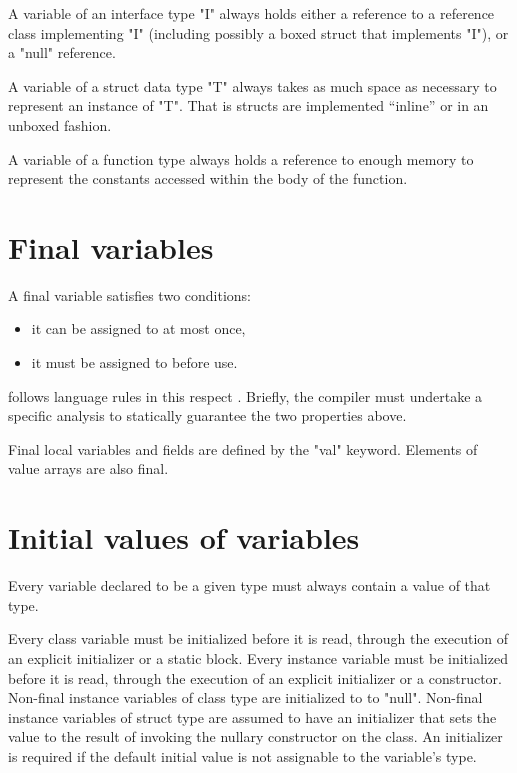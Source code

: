 
A variable of an interface type \xcd"I" always holds either a
reference to a reference class implementing \xcd"I" (including possibly
a boxed struct that implements \xcd"I"), or a \xcd"null"
reference.

A variable of a struct data type \xcd"T"  always takes as much
space as necessary to represent an instance of \xcd"T". That is
structs are implemented ``inline'' or in an unboxed fashion.

A variable of a function type always holds a reference to enough
memory to represent the constants accessed within the body of the
function.

\section{Final variables}
\label{FinalVariables}
A final variable satisfies two conditions: 
\begin{itemize}
\item it can be assigned to at most once, 
\item it must be assigned to before use. 
\end{itemize}

\Xten{} follows \java{} language rules in this respect \cite[\S
4.5.4,8.3.1.2,16]{jls2}. Briefly, the compiler must undertake a
specific analysis to statically guarantee the two properties above.

Final local variables and fields are defined by the \xcd"val"
keyword.  Elements of value arrays are also final.


\section{Initial values of variables}
\label{NullaryConstructor}

Every variable declared to be a given type must always contain a value of that type.

Every class variable must be initialized before it is read, through
the execution of an explicit initializer or a static block. Every
instance variable must be initialized before it is read, through the
execution of an explicit initializer or a constructor.
Non-final instance variables of class type are initialized to 
to \xcd"null".
Non-final instance variables of struct type are 
assumed to have an initializer that sets the value to the
result of invoking the nullary constructor on the class. 
An initializer is required if the default initial value is not
assignable to the variable's type.

